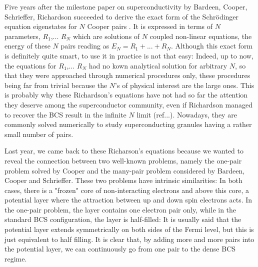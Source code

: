 \documentclass[aps,prb,superscriptaddress,twocolumn]{revtex4}
\begin{document}
Five years after the milestone paper on superconductivity by Bardeen,
Cooper, Schrieffer\cite{BCS}, Richardson succeeded to derive the exact form of the Schr\"{o}dinger equation eigenstates for $N$ Cooper pairs%
\cite{Richardson1,Richardson2}. It is expressed in terms
of $N$ parameters, $R_{1}$,... $R_{N}$ which are solutions of $N$ coupled
non-linear equations, the energy of these $N$ pairs reading as $E
_{N}=R_{1}+...+R_{N}$. Although this exact form is definitely quite smart, to
use it in practice is not that easy: Indeed, up to now, the equations for $R_{1}$,... $R_{N}$ had no
kown analytical solution for arbitrary $N$, so that they were approached through
numerical procedures only, these procedures being far from trivial because the $N$'s of physical interest are the large ones. This is probably why these Richardson's equations have not had so far the
attention they deserve among the superconductor community, even if Richardson managed to recover the BCS result in the infinite $N$ limit (ref...). Nowadays, they
are commonly solved numerically to study superconducting
granules having a rather small number of pairs.

Last year, we came back to  these Richarson's equations because we wanted to reveal the connection between two well-known problems, namely the
one-pair problem solved by Cooper and the many-pair problem considered by Bardeen, Cooper and Schrieffer. These two problems have intrinsic similarities: In
both cases, there is a "frozen" core of non-interacting electrons and above this core, a potential layer where the attraction between up and
down spin electrons acts. In the one-pair problem, the layer contains one electron pair only, while in the standard BCS configuration, the
layer is half-filled: It is usually said that the potential layer extends symmetrically on both sides of the Fermi level, but this is just equivalent to half filling.
It is clear that, by adding more and more pairs into the potential layer, we can continuously go from one pair to the dense BCS regime. 
\end{document}
